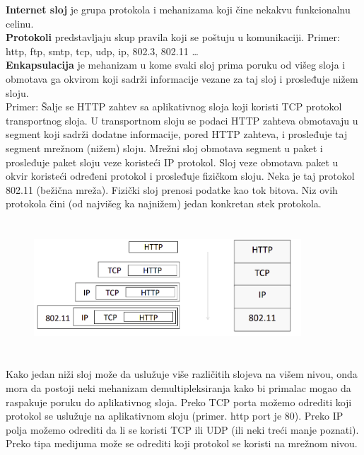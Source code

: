 \documentclass[a4paper]{article}
\begin{document}
    \textbf{Internet sloj} je grupa protokola i mehanizama koji čine nekakvu funkcionalnu celinu.\\
    \indent \textbf{Protokoli} predstavljaju skup pravila koji se poštuju u komunikaciji.
    Primer: http, ftp, smtp, tcp, udp, ip, 802.3, 802.11 \dots\\
    \indent \textbf{Enkapsulacija} je mehanizam u kome svaki sloj prima poruku od višeg sloja i 
    obmotava ga okvirom koji sadrži informacije vezane za taj sloj i prosleđuje nižem sloju. \\

    Primer: Šalje se HTTP zahtev sa aplikativnog sloja koji koristi TCP protokol transportnog sloja. 
    U transportnom sloju se podaci HTTP zahteva obmotavaju u segment koji sadrži dodatne informacije, 
    pored HTTP zahteva, i prosleđuje taj segment mrežnom (nižem) sloju. Mrežni sloj obmotava segment 
    u paket i prosleđuje paket sloju veze koristeći IP protokol. Sloj veze obmotava paket u okvir 
    koristeći određeni protokol i prosleđuje fizičkom sloju. Neka je taj protokol 802.11 (bežična mreža). 
    Fizički sloj prenosi podatke kao tok bitova. Niz ovih protokola čini (od najvišeg ka najnižem)
    jedan konkretan stek protokola.
    \begin{figure}[H]
        \begin{center}
            \includegraphics[width=100mm,height=50mm]{Slike/enkapsulacija.png}
        \end{center}
    \end{figure}
    \indent Kako jedan niži sloj može da uslužuje više različitih slojeva na višem nivou, 
    onda mora da postoji neki mehanizam demultipleksiranja kako bi primalac mogao
    da raspakuje poruku do aplikativnog sloja. Preko TCP porta možemo odrediti koji protokol
    se uslužuje na aplikativnom sloju (primer. http port je 80). Preko IP polja možemo odrediti
    da li se koristi TCP ili UDP (ili neki treći manje poznati). Preko tipa medijuma može se 
    odrediti koji protokol se koristi na mrežnom nivou.
\end{document}
